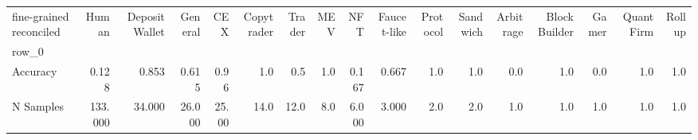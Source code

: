 \begin{tabular}{lrrrrrrrrrrrrrrrr}
\toprule
fine-grained reconciled &    Human &  Deposit Wallet &  General &    CEX &  Copytrader &  Trader &  MEV &    NFT &  Faucet-like &  Protocol &  Sandwich &  Arbitrage &  Block Builder &  Gamer &  Quant Firm &  Rollup \\
row\_0     &          &                 &          &        &             &         &      &        &              &           &           &            &                &        &             &         \\
\midrule
Accuracy  &    0.128 &           0.853 &    0.615 &   0.96 &         1.0 &     0.5 &  1.0 &  0.167 &        0.667 &       1.0 &       1.0 &        0.0 &            1.0 &    0.0 &         1.0 &     1.0 \\
N Samples &  133.000 &          34.000 &   26.000 &  25.00 &        14.0 &    12.0 &  8.0 &  6.000 &        3.000 &       2.0 &       2.0 &        1.0 &            1.0 &    1.0 &         1.0 &     1.0 \\
\bottomrule
\end{tabular}
